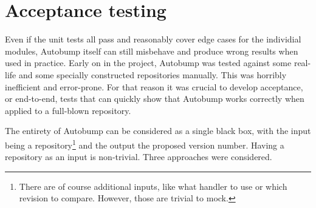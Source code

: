 \documentclass{l4proj}
\begin{document}
\section{Acceptance testing}

Even if the unit tests all pass and reasonably cover edge cases for
the individial modules, Autobump itself can still misbehave and
produce wrong results when used in practice. Early on in the project,
Autobump was tested against some real-life and some specially
constructed repositories manually. This was horribly inefficient and
error-prone. For that reason it was crucial to develop acceptance, or
end-to-end, tests that can quickly show that Autobump works correctly
when applied to a full-blown repository.

The entirety of Autobump can be considered as a single black box, with the
input being a repository\footnote{There are of course additional
inputs, like what handler to use or which revision to compare.
However, those are trivial to mock.} and the output the proposed
version number. Having a repository as an input is non-trivial.
Three approaches were considered.
\end{document}
